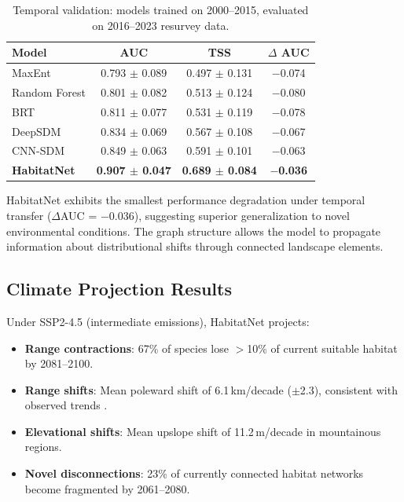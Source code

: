 \begin{table}[H]
\centering
\caption{Temporal validation: models trained on 2000--2015, evaluated on
2016--2023 resurvey data.}
\label{tab:temporal}
\begin{tabular}{lccc}
\toprule
\textbf{Model} & \textbf{AUC} & \textbf{TSS} & \textbf{$\Delta$ AUC} \\
\midrule
MaxEnt          & 0.793 $\pm$ 0.089 & 0.497 $\pm$ 0.131 & $-$0.074 \\
Random Forest   & 0.801 $\pm$ 0.082 & 0.513 $\pm$ 0.124 & $-$0.080 \\
BRT             & 0.811 $\pm$ 0.077 & 0.531 $\pm$ 0.119 & $-$0.078 \\
DeepSDM         & 0.834 $\pm$ 0.069 & 0.567 $\pm$ 0.108 & $-$0.067 \\
CNN-SDM         & 0.849 $\pm$ 0.063 & 0.591 $\pm$ 0.101 & $-$0.063 \\
\textbf{HabitatNet} & \textbf{0.907 $\pm$ 0.047} & \textbf{0.689 $\pm$ 0.084} & $-$\textbf{0.036} \\
\bottomrule
\end{tabular}
\end{table}

HabitatNet exhibits the smallest performance degradation under temporal
transfer ($\Delta$AUC = $-$0.036), suggesting superior generalization to
novel environmental conditions. The graph structure allows the model to
propagate information about distributional shifts through connected
landscape elements.

\subsection{Climate Projection Results}

Under SSP2-4.5 (intermediate emissions), HabitatNet projects:
\begin{itemize}
  \item \textbf{Range contractions}: 67\% of species lose $>$10\% of
    current suitable habitat by 2081--2100.
  \item \textbf{Range shifts}: Mean poleward shift of 6.1\,km/decade
    ($\pm$2.3), consistent with observed trends
    \citep{chen2011rapid}.
  \item \textbf{Elevational shifts}: Mean upslope shift of 11.2\,m/decade
    in mountainous regions.
  \item \textbf{Novel disconnections}: 23\% of currently connected
    habitat networks become fragmented by 2061--2080.
\end{itemize}


